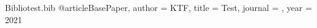 

\begin{filecontents}{Bibliotest.bib}
@article{BasePaper,
author = {KTF},
title = {Test},
journal = {},
year = {2021}
}
\end{filecontents}



\documentclass[sigconf]{acmart}







